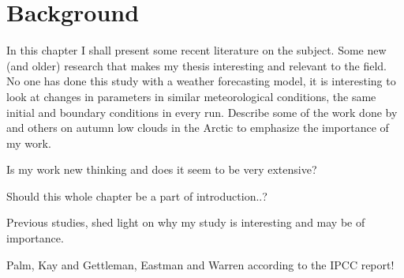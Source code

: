 \chapter{Background}%
\label{chap:background}
In this chapter I shall present some recent literature on the subject. Some new (and older) research that makes my thesis interesting and relevant to the field. No one has done this study with a weather forecasting model, it is interesting to look at changes in parameters in similar meteorological conditions, the same initial and boundary conditions in every run.
Describe some of the work done by \citet{Palm2010, Wu2012} and others on autumn low clouds in the Arctic to emphasize the importance of my work.

Is my work new thinking and does it seem to be very extensive?

Should this whole chapter be a part of introduction..?


Previous studies, shed light on why my study is interesting and may be of importance.

Palm, Kay and Gettleman, Eastman and Warren according to the IPCC report!